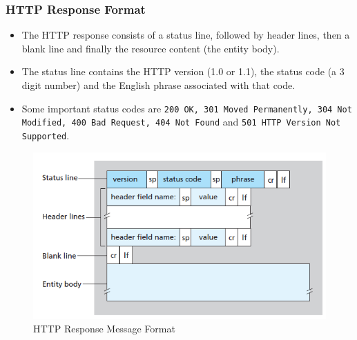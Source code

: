 \documentclass{article}
\theoremstyle{plain}
\theoremstyle{definition}
\begin{document}
\subsubsection{HTTP Response Format}
\begin{itemize}
    \item The HTTP response consists of a status line, followed by header lines, then a blank line and finally the resource content (the entity body). 
    
    \item The status line contains the HTTP version (1.0 or 1.1), the status code (a 3 digit number) and the English phrase associated with that code. 
    
    \item Some important status codes are \texttt{200 OK, 301 Moved Permanently, 304 Not Modified, 400 Bad Request, 404 Not Found} and \texttt{501 HTTP Version Not Supported}. 
\end{itemize}

\begin{figure}[!h]
    \centering
    \includegraphics[scale=0.8]{cn5.png}
    \caption{HTTP Response Message Format}
    \label{fig:my_label_5}
\end{figure}
\end{document}
